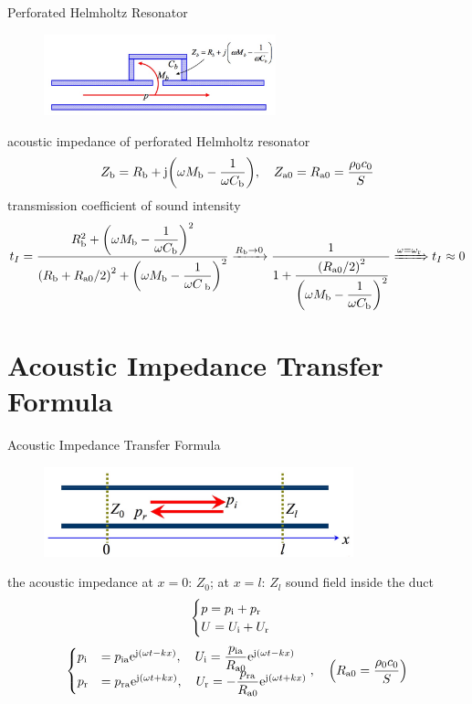 \documentclass[9pt,mathserif]{beamer}
\begin{document}
\begin{frame}{Perforated Helmholtz Resonator}
	\begin{figure}
		\centering
		\includegraphics[width=0.6\textwidth]{img/duct/perforatedHelmholtz.jpg}
	\end{figure}
	\begin{outline}
		\1 acoustic impedance of perforated Helmholtz resonator
		$$Z\st{b} = R\st{b} + \mj \qty(\omega M\st{b} - \frac{1}{\omega
			C\st{b}})\qc Z\st{a0} = R\st{a0} = \frac{\rho_0c_0}{S}$$
		\1 transmission coefficient of sound intensity
		$$
		t_I = \frac{R_\text{b}^2 + \qty(\omega M_\text{b} - \dfrac{1}{\omega C_\text{b}})
	^2}{\qty(R_\text{b}+R_\text{a0}/2)^2+\qty(\omega M_\text{b} - \dfrac{1}{\omega C_\text{
	b}})^2}
	\xrightarrow{R_\text{b}\to 0} \frac{1}{1+ \dfrac{\qty(R_\text{a0}/2)^2}{\qty(
		\omega M_\text{b} - \dfrac{1}{\omega C_\text{b}})^2}}
		\xRightarrow{\omega = \omega_\text{r}} t_I \approx 0
	$$
	\end{outline}
\end{frame}

\section{Acoustic Impedance Transfer Formula}
\begin{frame}{Acoustic Impedance Transfer Formula}
	\begin{figure}
		\centering
		\includegraphics[width=0.8\textwidth]{img/duct/impedTrans.jpg}
	\end{figure}
	\begin{outline}
		\1 the acoustic impedance at $x=0$: $Z_0$; at $x=l$: $Z_l$
		\1 sound field inside the duct
		$$\begin{cases}
			p = p_\text{i}+p_\text{r}\\
			U = U_\text{i} + U_\text{r}
		\end{cases}
		$$
		$$\begin{cases}
			p\st{i} & = p\st{ia} \me^{\mj (\omega t-kx)}\qc 
			U\st{i}  = \dfrac{p\st{ia}}{R\st{a0}} \me^{\mj (\omega t-
			 kx)}\\
			p\st{r} & = p\st{ra} \me^{\mj (\omega t+kx)}\qc 
			U\st{r}  = -\dfrac{p\st{ra}}{R\st{a0}} \me^{\mj (\omega t+
			kx)}
		\end{cases}
		\qc \qty(R\st{a0}=\frac{\rho_0c_0}{S})$$
	\end{outline}
\end{frame}
\end{document}
